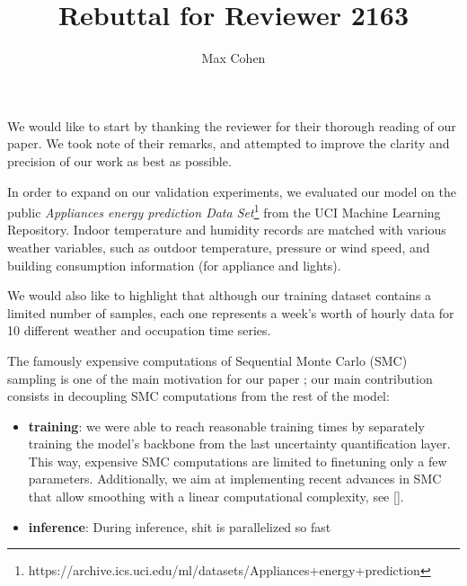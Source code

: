 \documentclass{article}
\title{Rebuttal for Reviewer 2163}
\author{Max Cohen}
\affil{Samovar, T\'el\'ecom SudParis, CITI, TIPIC, Institut Polyechnique de Paris}
\date{}
\begin{document}
\maketitle

We would like to start by thanking the reviewer for their thorough reading of our paper.
We took note of their remarks, and attempted to improve the clarity and precision of our work as best as possible.

In order to expand on our validation experiments, we evaluated our model on the public \textit{Appliances energy prediction Data Set}\footnote{https://archive.ics.uci.edu/ml/datasets/Appliances+energy+prediction} from the UCI Machine Learning Repository.
Indoor temperature and humidity records are matched with various weather variables, such as outdoor temperature, pressure or wind speed, and building consumption information (for appliance and lights).

We would also like to highlight that although our training dataset contains a limited number of samples, each one represents a week's worth of hourly data for 10 different weather and occupation time series.

The famously expensive computations of Sequential Monte Carlo (SMC) sampling is one of the main motivation for our paper ;
our main contribution consists in decoupling SMC computations from the rest of the model:
\begin{itemize}
	\item \textbf{training}: we were able to reach reasonable training times by separately training the model's backbone from the last uncertainty quantification layer.
		This way, expensive SMC computations are limited to finetuning only a few parameters.
		Additionally, we aim at implementing recent advances in SMC that allow smoothing with a linear computational complexity, see [].
	\item \textbf{inference}: During inference, shit is parallelized so fast
\end{itemize}
\end{document}
